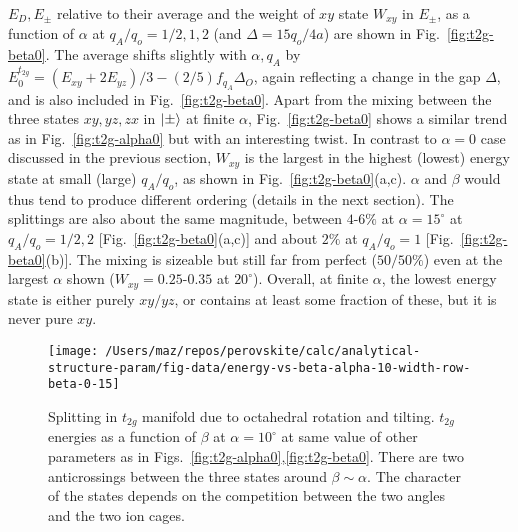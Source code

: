 \documentclass[a4paper,prb,twocolumn]{revtex4-1}  %
\begin{document}
$E_D, E_{\pm}$ relative to their average
and the weight of $xy$ state $W_{xy}$ in $E_{\pm}$,
as a function of $\alpha$ at $q_A/q_o=1/2,1,2$ (and $\Delta=15q_o/4a$)
are shown in Fig.~\ref{fig:t2g-beta0}.
The average shifts slightly with $\alpha,q_A$ by 
$E_0^{t_{2g}}= \left(E_{xy} + 2 E_{yz}\right)/3-(2/5)f_{q_A}\Delta_{O}$,
again reflecting 
a change in the gap $\Delta$,
and is also included in Fig.~\ref{fig:t2g-beta0}.
Apart from the mixing between the three states $xy,yz,zx$ in $\ket{\pm}$ at finite $\alpha$, 
Fig.~\ref{fig:t2g-beta0} shows a similar trend as in Fig.~\ref{fig:t2g-alpha0}
but with an interesting twist.
In contrast to $\alpha=0$ case discussed in the previous section,
$W_{xy}$ is the largest in the highest (lowest) energy state at small (large) $q_A/q_o$,
as shown in Fig.~\ref{fig:t2g-beta0}(a,c).
$\alpha$ and $\beta$ would thus tend to produce different ordering
(details in the next section).
The splittings are also about the same magnitude, between $4$-$6\%$ at $\alpha=15^\circ$
at $q_A/q_o=1/2,2$ [Fig.~\ref{fig:t2g-beta0}(a,c)] and about $2\%$ at $q_A/q_o=1$ [Fig.~\ref{fig:t2g-beta0}(b)].
The mixing is sizeable but still far from perfect ($50/50\%$) even at the largest $\alpha$ shown ($W_{xy}=0.25$-$0.35$ at $20^\circ$).
Overall, at finite $\alpha$,
the lowest energy state is either purely $xy/yz$,
or contains at least some fraction of these,
but it is never pure $xy$.






\begin{figure}[htbp]
\begin{center}
\texttt{[image: /Users/maz/repos/perovskite/calc/analytical-structure-param/fig-data/energy-vs-beta-alpha-10-width-row-beta-0-15]}
\caption{
Splitting in $t_{2g}$ manifold due to octahedral rotation and tilting.
$t_{2g}$ energies as a function of $\beta$ at $\alpha=10^\circ$
at same value of other parameters as in Figs.~\ref{fig:t2g-alpha0},\ref{fig:t2g-beta0}.
There are two anticrossings between the three states around $\beta\sim\alpha$.
The character of the states depends on 
the competition between the two angles and 
the two ion cages.
}
\label{fig:t2g-ge-Es}
\end{center}
\end{figure}
\end{document}
